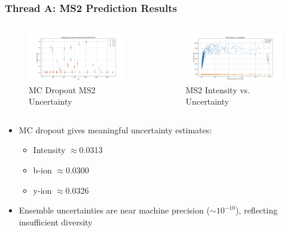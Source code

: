 \documentclass{beamer}
\begin{document}
\begin{frame}
  \frametitle{Thread A: MS2 Prediction Results}
  \begin{columns}
      \begin{figure}
        \includegraphics[width=0.95\linewidth]{reports/mc_dropout_ms2_uncertainty_AKVTEFGCGTR.png}
        \caption{MC Dropout MS2 Uncertainty}
      \end{figure}
      \begin{figure}
        \includegraphics[width=0.95\linewidth]{reports/ms2_intensity_vs_uncertainty.png}
        \caption{MS2 Intensity vs. Uncertainty}
      \end{figure}
  \end{columns}
  \begin{itemize}
    \item MC dropout gives meaningful uncertainty estimates:
    \begin{itemize}
      \item Intensity $\approx$0.0313
      \item b-ion $\approx$0.0300
      \item y-ion $\approx$0.0326
    \end{itemize}
    \item Ensemble uncertainties are near machine precision ($\sim10^{-10}$), reflecting insufficient diversity
  \end{itemize}
\end{frame}
\end{document}
